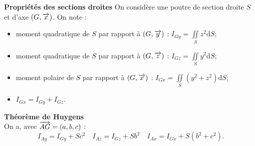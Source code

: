 \documentclass[10pt,fleqn]{article} %
\begin{document}
\begin{prop}
\textbf{Propriétés des sections droites}
On considère une poutre de section droite $S$ et d'axe $\left(G,\overrightarrow{x} \right)$. On note :
\begin{itemize}
\item moment quadratique de $S$ par rapport à $\left(G,\overrightarrow{y} \right)$ : $I_{Gy} = \iint\limits_S z^2 \text{d}S$;
\item moment quadratique de $S$ par rapport à $\left(G,\overrightarrow{z} \right)$ : $I_{Gz} = \iint\limits_S y^2 \text{d}S$;
\item moment polaire de $S$ par rapport à $\left(G,\overrightarrow{x} \right)$ : $I_{Gx} = \iint\limits_S \left( y^2 + z^2 \right) \text{d}S$;
\item $I_{Gx}=I_{Gy}+I_{Gz}$.
\end{itemize}
\end{prop}

\begin{theorem}
\textbf{Théorème de Huygens} ~\\
On a, avec $\overrightarrow{AG}=\left(a,b,c \right)$ :
$$
I_{Ay}=I_{Gy} + Sc^2 
\quad 
I_{Az}=I_{Gz} + Sb^2 
\quad 
I_{Ax}=I_{Gx} + S\left(b^2+c^2 \right). 
$$
\end{theorem}
\end{document}
